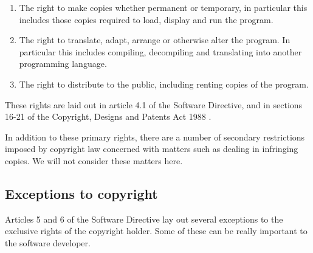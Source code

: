 \documentclass[a4paper,12pt]{article}
\newcommand{\CDPA}[1][]{Copyright, Designs and Patents Act 1988 #1\xspace}
\begin{document}
\begin{enumerate}
\item The right to make copies whether permanent or temporary, in particular
  this includes those copies required to load, display and run the program.
\item The right to translate, adapt, arrange or otherwise alter the
  program. In particular this includes compiling, decompiling and translating
  into another programming language.
\item The right to distribute to the public, including renting copies of the
  program.
\end{enumerate}

These rights are laid out in article 4.1 of the Software Directive, and in
sections 16-21 of the \CDPA. 

In addition to these primary rights, there are a number of secondary
restrictions imposed by copyright law concerned with matters such as dealing
in infringing copies. We will not consider these matters here.

\subsection{Exceptions to copyright}

Articles 5 and 6 of the Software Directive lay out several 
exceptions to the exclusive rights of the copyright holder. Some of these
can be really important to the software developer.
\end{document}
